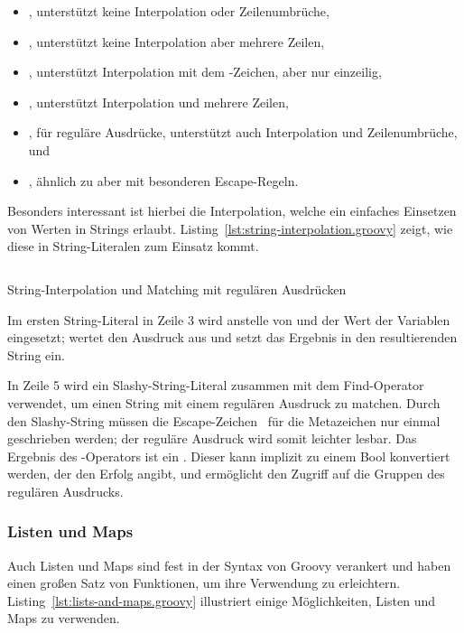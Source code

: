 \documentclass[a4paper]{article}
\newcommand{\codelisting}[3]{
\begin{listing}[ht]
	\inputminted{#1}{#1/#2}
	\vspace{-3ex}
	\caption{#3}
	\label{lst:#2}
\end{listing}
}
\begin{document}
\begin{itemize}\setlength{\itemsep}{0pt}\setlength{\parskip}{0pt}\setlength{\parsep}{0pt}
\item {}, unterstützt keine Interpolation oder Zeilenumbrüche,
\item {}, unterstützt keine Interpolation aber mehrere Zeilen,
\item {}, unterstützt Interpolation mit dem \code{$}-Zeichen, aber nur einzeilig,
\item {}, unterstützt Interpolation und mehrere Zeilen,
\item {}, für reguläre Ausdrücke, unterstützt auch Interpolation und Zeilenumbrüche, und
\item {}, ähnlich zu  aber mit besonderen Escape-Regeln.
\end{itemize}

Besonders interessant ist hierbei die Interpolation, welche ein einfaches Einsetzen von Werten in Strings erlaubt.
Listing~\ref{lst:string-interpolation.groovy} zeigt, wie diese in String-Literalen zum Einsatz kommt.

\codelisting{groovy}{string-interpolation.groovy}{String-Interpolation und Matching mit regulären Ausdrücken}

Im ersten String-Literal in Zeile 3 wird anstelle von  und  der Wert der Variablen eingesetzt;
 wertet den Ausdruck  aus und setzt das Ergebnis in den resultierenden String ein.

In Zeile 5 wird ein Slashy-String-Literal zusammen mit dem Find-Operator \code{=~} verwendet, um einen String mit einem regulären Ausdruck zu matchen.
Durch den Slashy-String müssen die Escape-Zeichen~\plain{\ } für die Metazeichen nur einmal geschrieben werden; der reguläre Ausdruck wird somit leichter lesbar.
Das Ergebnis des \code{=~}-Operators ist ein .
Dieser kann implizit zu einem Bool konvertiert werden, der den Erfolg angibt, und ermöglicht den Zugriff auf die Gruppen des regulären Ausdrucks.

\subsubsection{Listen und Maps}\label{subsubsec:listen-und-maps}

Auch Listen und Maps sind fest in der Syntax von Groovy verankert und haben einen großen Satz von Funktionen, um ihre Verwendung zu erleichtern.
Listing~\ref{lst:lists-and-maps.groovy} illustriert einige Möglichkeiten, Listen und Maps zu verwenden.
\end{document}
